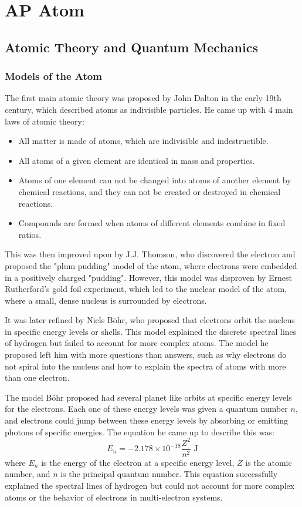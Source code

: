 \section{AP Atom}
\subsection{Atomic Theory and Quantum Mechanics}
\subsubsection{Models of the Atom}\label{sec:atomModels}
The first main atomic theory was proposed by John Dalton in the early 19th century, which described atoms as indivisible particles. He came up with 4 main laws of atomic theory:
\begin{itemize}
    \item All matter is made of atoms, which are indivisible and indestructible.
    \item All atoms of a given element are identical in mass and properties.
    \item Atoms of one element can not be changed into atoms of another element by chemical reactions, and they can not be created or destroyed in chemical reactions.
    \item Compounds are formed when atoms of different elements combine in fixed ratios.
\end{itemize}
This was then improved upon by J.J. Thomson, who discovered the electron and proposed the "plum pudding" model of the atom, where electrons were embedded in a positively charged "pudding". However, this model was disproven by Ernest Rutherford's gold foil experiment, which led to the nuclear model of the atom, where a small, dense nucleus is surrounded by electrons.

It was later refined by Niels Böhr, who proposed that electrons orbit the nucleus in specific energy levels or shells. This model explained the discrete spectral lines of hydrogen but failed to account for more complex atoms. The model he proposed left him with more questions than answers, such as why electrons do not spiral into the nucleus and how to explain the spectra of atoms with more than one electron.

The model Böhr proposed had several planet like orbits at specific energy levels for the electrons. Each one of these energy levels was given a quantum number $n$, and electrons could jump between these energy levels by absorbing or emitting photons of specific energies. The equation he came up to describe this was:
\begin{equation}\label{eq:bohr}
    E_n = -2.178 \times 10^{-18} \frac{Z^2}{n^2} \text{ J}
\end{equation}
where $E_n$ is the energy of the electron at a specific energy level, $Z$ is the atomic number, and $n$ is the principal quantum number. This equation successfully explained the spectral lines of hydrogen but could not account for more complex atoms or the behavior of electrons in multi-electron systems.

